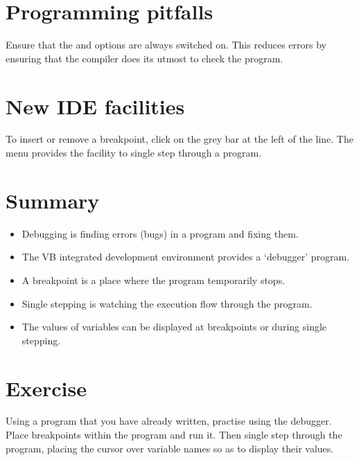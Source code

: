 	\section{Programming pitfalls}
		Ensure that the  and  options are always switched on. This reduces errors by ensuring that the compiler does its utmost to check the program.


	\section{New IDE facilities}
		To insert or remove a breakpoint, click on the grey bar at the left of the line. The  menu provides the facility to single step through a program.


	\section{Summary}
		\begin{itemize}
      \item Debugging is finding errors (bugs) in a program and fixing them.
      \item The VB integrated development environment provides a ‘debugger’ program.
      \item A breakpoint is a place where the program temporarily stops.
      \item Single stepping is watching the execution flow through the program.
      \item The values of variables can be displayed at breakpoints or during single stepping.
		\end{itemize}


	\section{Exercise}
		
		\begin{EXE}
			\item	Using a program that you have already written, practise using the debugger. Place breakpoints within the program and run it. Then single step through the program, placing the cursor over variable names so as to display their values.
		\end{EXE}
